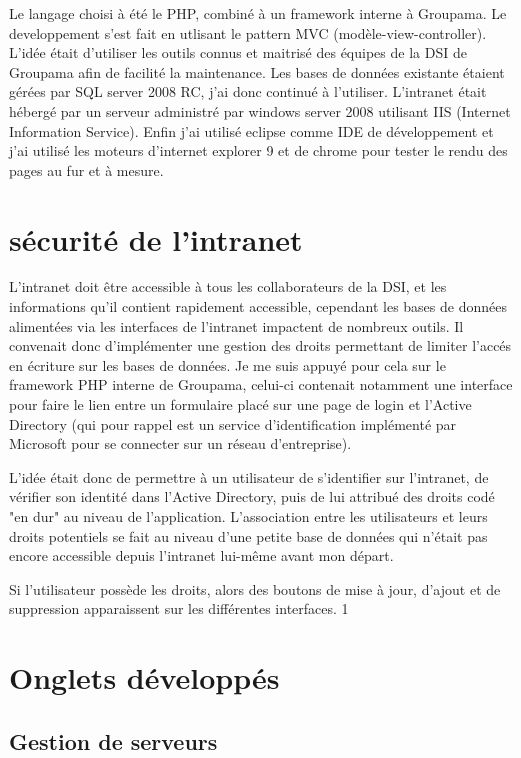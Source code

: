 Le langage choisi à été le PHP, combiné à un framework interne à
Groupama. Le developpement s'est fait en utlisant le pattern MVC
(modèle-view-controller). L'idée était d'utiliser les outils connus et
maitrisé des équipes de la DSI de Groupama afin de facilité la
maintenance. Les bases de données existante étaient gérées par SQL
server 2008 RC, j'ai donc continué à l'utiliser. L'intranet était
hébergé par un serveur administré par windows server 2008 utilisant
IIS (Internet Information Service). Enfin j'ai utilisé eclipse comme IDE 
de développement et j'ai utilisé les moteurs d'internet explorer 9 et de 
chrome pour tester le rendu des pages au fur et à mesure.


\section{sécurité de l'intranet}

L'intranet doit être accessible à tous les collaborateurs de la DSI,
et les informations qu'il contient rapidement accessible, cependant
les bases de données alimentées via les interfaces de l'intranet
impactent de nombreux outils. Il convenait donc d'implémenter une
gestion des droits permettant de limiter l'accés en écriture sur les
bases de données. Je me suis appuyé pour cela sur le framework PHP
interne de Groupama, celui-ci contenait notamment une interface pour
faire le lien entre un formulaire placé sur une page de login et
l'Active Directory (qui pour rappel est un service d'identification 
implémenté par Microsoft pour se connecter sur un réseau d'entreprise).

L'idée était donc de permettre à un utilisateur de s'identifier sur
l'intranet, de vérifier son identité dans l'Active Directory, puis de
lui attribué des droits codé "en dur" au niveau de
l'application. L'association entre les utilisateurs et leurs droits
potentiels se fait au niveau d'une petite base de données qui n'était
pas encore accessible depuis l'intranet lui-même avant mon départ.

Si l'utilisateur possède les droits, alors des boutons de mise à jour,
d'ajout et de suppression apparaissent sur les différentes interfaces.
1

\section{Onglets développés}

\subsection{Gestion de serveurs}

